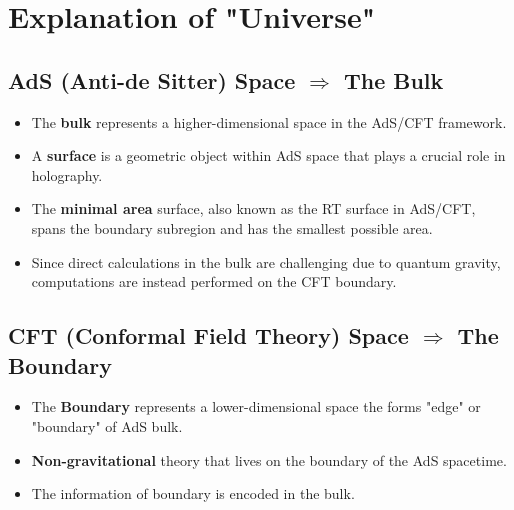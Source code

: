 \documentclass[12pt]{article}
\begin{document}
\section{Explanation of "Universe"}
    \subsection*{AdS (Anti-de Sitter) Space $\Rightarrow$ The Bulk}
    \begin{itemize}
        \item The \textbf{bulk} represents a higher-dimensional space in the AdS/CFT framework.  
        \item A \textbf{surface} is a geometric object within AdS space that plays a crucial role in holography.  
        \item The \textbf{minimal area} surface, also known as the RT surface in AdS/CFT, spans the boundary subregion and has the smallest possible area.  
        \item Since direct calculations in the bulk are challenging due to quantum gravity, computations are instead performed on the CFT boundary.  
    \end{itemize}

    \subsection*{CFT (Conformal Field Theory) Space $\Rightarrow$ The Boundary}
    \begin{itemize}
        \item The \textbf{Boundary} represents a lower-dimensional space the forms "edge" or "boundary" of AdS bulk.
        \item \textbf{Non-gravitational} theory that lives on the boundary of the AdS spacetime.
        \item The information of boundary is encoded in the bulk.
    \end{itemize}
\end{document}
